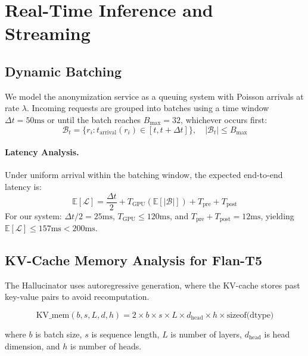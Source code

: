 \documentclass[11pt, a4paper]{article}
\newcommand{\E}{\mathbb{E}}
\begin{document}
\section{Real-Time Inference and Streaming}
\label{sec:realtime-inference}

\subsection{Dynamic Batching}

We model the anonymization service as a queuing system with Poisson arrivals at rate $\lambda$.  Incoming requests are grouped into batches using a time window $\Delta t = 50\text{ms}$ or until the batch reaches $B_{\max} = 32$, whichever occurs first:
\begin{equation}
\mathcal{B}_t = \{r_i : t_{\text{arrival}}(r_i) \in [t, t + \Delta t]\}, \quad |\mathcal{B}_t| \leq B_{\max}
\end{equation}

\paragraph{Latency Analysis.}
Under uniform arrival within the batching window, the expected end-to-end latency is:
\begin{equation}
\E[\mathcal{L}] = \frac{\Delta t}{2} + T_{\text{GPU}}(\E[|\mathcal{B}|]) + T_{\text{pre}} + T_{\text{post}}
\end{equation}
For our system: $\Delta t/2 = 25\text{ms}$, $T_{\text{GPU}} \leq 120\text{ms}$, and $T_{\text{pre}} + T_{\text{post}} = 12\text{ms}$, yielding $\E[\mathcal{L}] \leq 157\text{ms} < 200\text{ms}$.

\subsection{KV-Cache Memory Analysis for Flan-T5}

The Hallucinator uses autoregressive generation, where the KV-cache stores past key-value pairs to avoid recomputation.

\begin{equation}
\text{KV\_mem}(b, s, L, d, h) = 2 \times b \times s \times L \times d_{\text{head}} \times h \times \text{sizeof(dtype)}
\end{equation}

where $b$ is batch size, $s$ is sequence length, $L$ is number of layers, $d_{\text{head}}$ is head dimension, and $h$ is number of heads.
\end{document}

